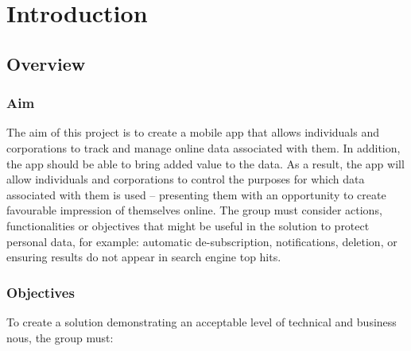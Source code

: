 \section{Introduction}

\subsection{Overview}

\subsubsection{Aim}

The aim of this project is to create a mobile app that allows individuals and corporations to track and manage online data associated with them. In addition, the app should be able to bring added value to the data. As a result, the app will allow individuals and corporations to control the purposes for which data associated with them is used – presenting them with an opportunity to create favourable impression of themselves online. The group must consider actions, functionalities or objectives that might be useful in the solution to protect personal data, for example: automatic de-subscription, notifications, deletion, or ensuring results do not appear in search engine top hits.

\subsubsection{Objectives}

To create a solution demonstrating an acceptable level of technical and business nous, the group must:

